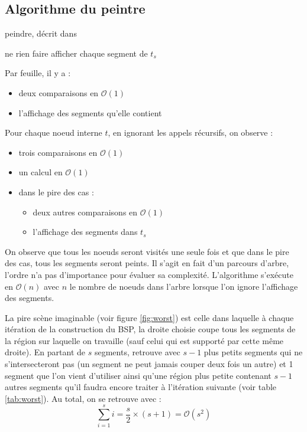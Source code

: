 \documentclass[12pt,twocolumn]{article}
\newcommand{\bigO}{\mathcal{O}}
\newcommand{\es}{\emptyset}
\begin{document}
\subsection{Algorithme du peintre}
\begin{algorithm}
\caption{peindre, décrit dans \cite[p.~255]{cg}}
\SetAlgoLined\DontPrintSemicolon
{}
\uIf{$t=\es$} {
	ne rien faire
}
\uElseIf{$(t^+=\es) \land (t^-=\es)$} {
	afficher chaque segment de $t_s$
}
~
\end{algorithm}

Par feuille, il y a :
\begin{itemize}
	\item deux comparaisons en $\bigO(1)$
	\item l'affichage des segments qu'elle contient
\end{itemize}

Pour chaque noeud interne $t$, en ignorant les appels récursifs, on observe :
\begin{itemize}
	\item trois comparaisons en $\bigO(1)$
	\item un calcul en $\bigO(1)$
	\item dans le pire des cas :
		\begin{itemize}
			\item deux autres comparaisons en $\bigO(1)$
			\item l'affichage des segments dans $t_s$
		\end{itemize}
\end{itemize}

On observe que tous les noeuds seront visités une seule fois et que dans le pire
des cas, tous les segments seront peints. Il s'agit en fait d'un parcours
d'arbre, l'ordre n'a pas d'importance pour évaluer sa complexité. L'algorithme
s'exécute en $\bigO(n)$ avec $n$ le nombre de noeuds dans l'arbre
lorsque l'on ignore l'affichage des segments.

La pire scène imaginable (voir figure \ref{fig:worst}) est celle
dans laquelle à chaque itération de la construction du BSP, la droite choisie
coupe tous les segments de la région sur laquelle on travaille (sauf celui qui
est supporté par cette même droite). En partant de $s$ segments, retrouve avec
$s-1$ plus petits segments qui ne s'intersecteront pas (un segment ne peut
jamais couper deux fois un autre) et 1 segment que l'on vient d'utiliser
ainsi qu'une région plus petite contenant $s-1$ autres segments
qu'il faudra encore traiter à l'itération suivante (voir table \ref{tab:worst}).
Au total, on se retrouve avec :
\[
	\sum_{i=1}^{s}i = \frac s2\times (s+1) = \bigO(s^2)
\]
\end{document}
